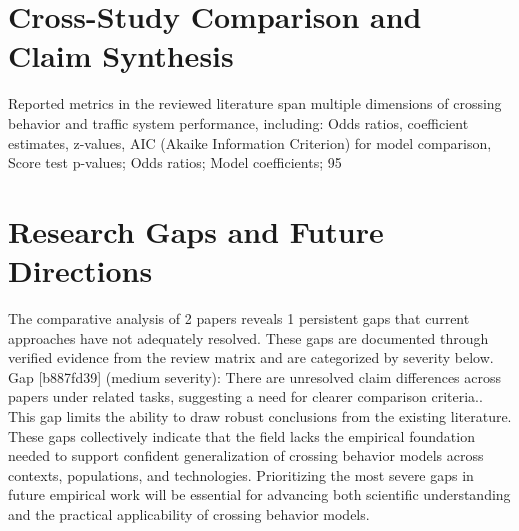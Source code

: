 \documentclass{article}
\begin{document}
\section{Cross-Study Comparison and Claim Synthesis}
Reported metrics in the reviewed literature span multiple dimensions of crossing behavior and traffic system performance, including: Odds ratios, coefficient estimates, z-values, AIC (Akaike Information Criterion) for model comparison, Score test p-values; Odds ratios; Model coefficients; 95%

\section{Research Gaps and Future Directions}
The comparative analysis of 2 papers reveals 1 persistent gaps that current approaches have not adequately resolved. These gaps are documented through verified evidence from the review matrix and are categorized by severity below. Gap [b887fd39] (medium severity): There are unresolved claim differences across papers under related tasks, suggesting a need for clearer comparison criteria.. This gap limits the ability to draw robust conclusions from the existing literature. These gaps collectively indicate that the field lacks the empirical foundation needed to support confident generalization of crossing behavior models across contexts, populations, and technologies. Prioritizing the most severe gaps in future empirical work will be essential for advancing both scientific understanding and the practical applicability of crossing behavior models.
\end{document}
